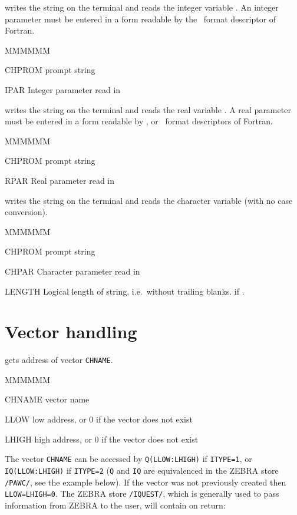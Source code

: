 \Action writes the string  on the terminal
and reads the integer variable .
An integer parameter
must be entered in a form readable by the ~format descriptor of Fortran.
\Pdesc\begin{DLtt}{MMMMMM}
\item[CHPROM] prompt string
\item[IPAR] Integer parameter read in
\end{DLtt}

\Action writes the string  on the terminal
and reads the real variable .
A real parameter
must be entered in a form readable by ,  
or ~format descriptors of Fortran.
\Pdesc\begin{DLtt}{MMMMMM}
\item[CHPROM] prompt string
\item[RPAR] Real parameter read in
\end{DLtt}

\Action writes the string  on the terminal
and reads the character variable 
(with no case conversion).
\Pdesc\begin{DLtt}{MMMMMM}
\item[CHPROM] prompt string
\item[CHPAR] Character parameter read in
\item[LENGTH] Logical length of string, i.e.\ without
trailing blanks.
 if .
\end{DLtt}

\section{Vector handling}

\Action gets address of vector {\tt CHNAME}.
\Pdesc\begin{DLtt}{MMMMMM}
\item[CHNAME] vector name
\item[LLOW] low address, or 0 if the vector does not exist
\item[LHIGH] high address, or 0 if the vector does not exist
\end{DLtt}
\Remark
The vector {\tt CHNAME} can be accessed by 
{\tt Q(LLOW:LHIGH)} if {\tt ITYPE=1},
or {\tt IQ(LLOW:LHIGH)} if {\tt ITYPE=2}
({\tt Q} and {\tt IQ} are equivalenced in the ZEBRA
store {\tt /PAWC/}, see the example below).
If the vector was not previously created then {\tt LLOW=LHIGH=0}.
The ZEBRA store {\tt /IQUEST/}, which is generally used to pass information
from ZEBRA to the user, will contain on return:

